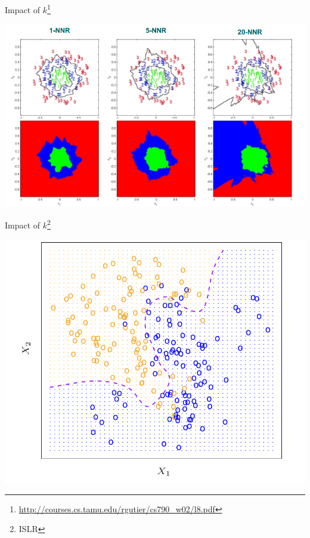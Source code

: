 \documentclass{beamer}
\newcommand{\furl}[1]{{\footnote{\url{#1}}}}
\begin{document}
\begin{frame}{Impact of $k$\furl{http://courses.cs.tamu.edu/rgutier/cs790_w02/l8.pdf}}
    \begin{center}
        \includegraphics[scale=0.3]{varingK.png}
    \end{center}
\end{frame}
\begin{frame}{Impact of $k$\footnote{ISLR}}
    \begin{center}
        \includegraphics[scale=0.3]{knn2D.png}
    \end{center}
\end{frame}
\end{document}
